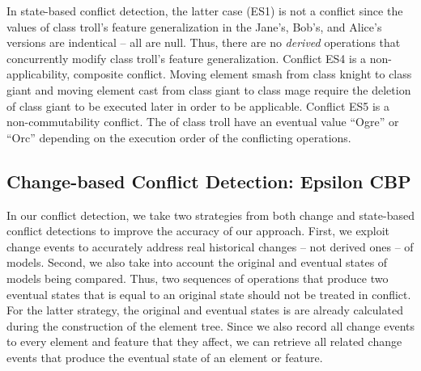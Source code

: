 In state-based conflict detection, the latter case (ES1) is not a conflict since the values of class \textsf{troll}'s feature \textsf{generalization} in the Jane's, Bob's, and Alice's versions are indentical -- all are null. Thus, there are no \textit{derived} operations that concurrently modify class \textsf{troll}'s feature \textsf{generalization}. Conflict ES4 is a non-applicability, composite conflict. Moving element \textsf{smash} from class \textsf{knight} to class \textsf{giant} and moving element \textsf{cast} from class \textsf{giant} to class \textsf{mage} require the deletion of class \textsf{giant} to be executed later in order to be applicable. Conflict ES5 is a non-commutability conflict. The  of class \textsf{troll} have an eventual value ``Ogre'' or ``Orc'' depending on the execution order of the conflicting operations.

%
%
%

\subsection{Change-based Conflict Detection: Epsilon CBP}
\label{change_based_conflict_detection_epsilon_cbp}

In our conflict detection, we take two strategies from both change and state-based conflict detections to improve the accuracy of our approach. First, we exploit change events to accurately address real historical changes -- not derived ones -- of models. Second, we also take into account the original and eventual states of models being compared. Thus, two sequences of operations that produce two eventual states that is equal to an original state should not be treated in conflict. For the latter strategy, the original and eventual states is are already calculated during the construction of the \textsf{element tree}. Since we also record all change events to every element and feature that they affect, we can retrieve all related change events that produce the eventual state of an element or feature. 

